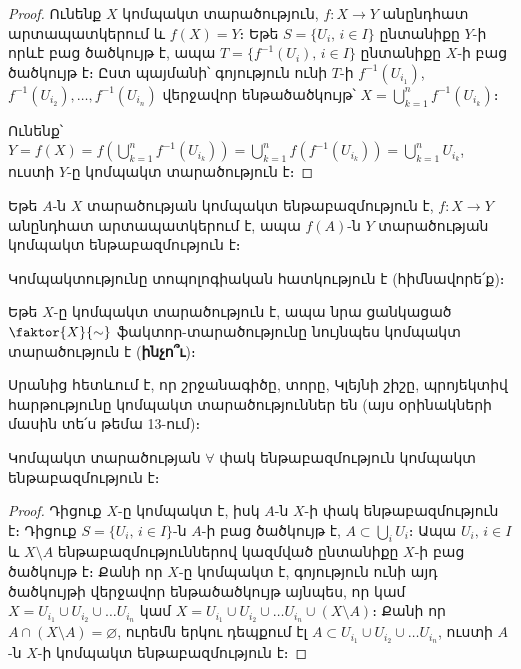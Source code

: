 \documentclass[./main.tex]{subfiles}
\begin{document}
\begin{proof}
Ունենք $X$ կոմպակտ տարածություն, $f:X\rightarrow Y$ անընդհատ արտապատկերում և ${f(X)=Y}$։ Եթե $S=\{U_i,\, i\in I\}$ ընտանիքը $Y$-ի որևէ բաց ծածկույթ է, ապա ${T=\{f^{-1}(U_i),\, i\in I\} }$  ընտանիքը $X$-ի բաց ծածկույթ է։ Ըստ պայ\-մանի՝ գոյություն ունի $T$-ի ${f^{-1}(U_{i_1})}$, ${f^{-1}(U_{i_2}), \dots , f^{-1}(U_{i_n})}$ վերջավոր ենթածած\-կույթ՝ $X=\bigcup\limits_{k=1}^n f^{-1}(U_{i_k})$։

\par Ունենք՝ $Y= f(X)=f\left(\bigcup\limits_{k=1}^n f^{-1}(U_{i_k})\right)=\bigcup\limits_{k=1}^n f(f^{-1}(U_{i_k}))=\bigcup\limits_{k=1}^nU_{i_k}$, ուստի $Y$-ը կոմպակտ տարածություն է։
\end{proof}

\begin{hetevanq_counter}\label{ch17cor1}
Եթե $A$-ն $X$ տարածության կոմպակտ ենթաբազմություն է, ${f:X\rightarrow Y}$ անընդհատ արտապատկերում է, ապա $f(A)$-ն $Y$ տարածության կոմպակտ են\-թա\-բազ\-մու\-թյուն է։
\end{hetevanq_counter} %
\begin{hetevanq_counter}\label{ch17cor2}
Կոմպակտությունը տոպոլոգիական հատկություն է (հիմնավորե՛ք)։
\end{hetevanq_counter} %
\begin{hetevanq_counter}\label{ch17cor3}
Եթե $X$-ը կոմպակտ տարածություն է, ապա նրա ցանկացած $\faktor{X}{\sim}$ ֆակտոր-տարածությունը նույնպես կոմպակտ տարածություն է (\textbf{ինչո՞ւ})։
\end{hetevanq_counter} %

\par Սրանից հետևում է, որ շրջանագիծը, տորը, Կլեյնի շիշը, պրոյեկտիվ հար\-թու\-թ\-յունը կոմպակտ տարածություններ են (այս օրինակների մասին տե՛ս թեմա 13-ում)։

\begin{theorem}\label{ch17thm4}\label{թեորեմ 4}
Կոմպակտ տարածության $\forall$ փակ ենթաբազմություն կոմպակտ \linebreak ենթա\-բազմություն է։
\end{theorem} %

\begin{proof}
Դիցուք $X$-ը կոմպակտ է, իսկ $A$-ն $X$-ի փակ ենթաբազմություն է։ Դիցուք $S=\{ U_i,\, i\in I\} $-ն $A$-ի բաց ծածկույթ է, $A\subset \bigcup\limits_i U_i$։ Ապա $U_i,\, i\in I$ և $X\setminus A$ ենթաբազմություններով կազմված ընտանիքը $X$-ի բաց ծածկույթ է։ Քանի որ $X$-ը կոմպակտ է, գոյություն ունի այդ ծածկույթի վերջավոր ենթածածկույթ այնպես, որ կամ $X=U_{i_1}\cup U_{i_2}\cup \dots U_{i_n}$ կամ $X=U_{i_1}\cup U_{i_2}\cup \dots U_{i_n}\cup(X\setminus A)$։ Քանի որ $A \cap (X \setminus A) = \varnothing$, ուրեմն երկու դեպքում էլ $A\subset U_{i_1}\cup U_{i_2}\cup \dots U_{i_n}$, ուստի $A$-ն $X$-ի կոմպակտ ենթաբազմություն է։
\end{proof}
\end{document}

